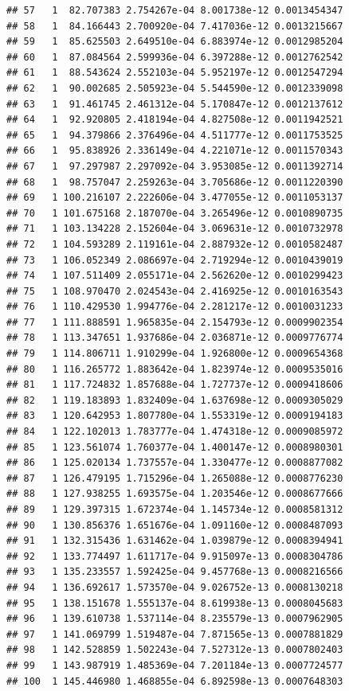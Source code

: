 \documentclass[article]{jss}\usepackage[]{graphicx}\usepackage[]{xcolor}
\makeatletter
\newenvironment{kframe}{%
 \def\at@end@of@kframe{}%
 \ifinner\ifhmode%
  \def\at@end@of@kframe{\end{minipage}}%
  \begin{minipage}{\columnwidth}%
 \fi\fi%
 \def\FrameCommand##1{\hskip\@totalleftmargin \hskip-\fboxsep
 \colorbox{shadecolor}{##1}\hskip-\fboxsep
     \hskip-\linewidth \hskip-\@totalleftmargin \hskip\columnwidth}%
 \MakeFramed {\advance\hsize-\width
   \@totalleftmargin\z@ \linewidth\hsize
   \@setminipage}}%
 {\par\unskip\endMakeFramed%
 \at@end@of@kframe}
\newenvironment{knitrout}{}{} %
\makeatother
\begin{document}
\begin{knitrout}
\begin{kframe}
\begin{verbatim}
## 57   1  82.707383 2.754267e-04 8.001738e-12 0.0013454347
## 58   1  84.166443 2.700920e-04 7.417036e-12 0.0013215667
## 59   1  85.625503 2.649510e-04 6.883974e-12 0.0012985204
## 60   1  87.084564 2.599936e-04 6.397288e-12 0.0012762542
## 61   1  88.543624 2.552103e-04 5.952197e-12 0.0012547294
## 62   1  90.002685 2.505923e-04 5.544590e-12 0.0012339098
## 63   1  91.461745 2.461312e-04 5.170847e-12 0.0012137612
## 64   1  92.920805 2.418194e-04 4.827508e-12 0.0011942521
## 65   1  94.379866 2.376496e-04 4.511777e-12 0.0011753525
## 66   1  95.838926 2.336149e-04 4.221071e-12 0.0011570343
## 67   1  97.297987 2.297092e-04 3.953085e-12 0.0011392714
## 68   1  98.757047 2.259263e-04 3.705686e-12 0.0011220390
## 69   1 100.216107 2.222606e-04 3.477055e-12 0.0011053137
## 70   1 101.675168 2.187070e-04 3.265496e-12 0.0010890735
## 71   1 103.134228 2.152604e-04 3.069631e-12 0.0010732978
## 72   1 104.593289 2.119161e-04 2.887932e-12 0.0010582487
## 73   1 106.052349 2.086697e-04 2.719294e-12 0.0010439019
## 74   1 107.511409 2.055171e-04 2.562620e-12 0.0010299423
## 75   1 108.970470 2.024543e-04 2.416925e-12 0.0010163543
## 76   1 110.429530 1.994776e-04 2.281217e-12 0.0010031233
## 77   1 111.888591 1.965835e-04 2.154793e-12 0.0009902354
## 78   1 113.347651 1.937686e-04 2.036871e-12 0.0009776774
## 79   1 114.806711 1.910299e-04 1.926800e-12 0.0009654368
## 80   1 116.265772 1.883642e-04 1.823974e-12 0.0009535016
## 81   1 117.724832 1.857688e-04 1.727737e-12 0.0009418606
## 82   1 119.183893 1.832409e-04 1.637698e-12 0.0009305029
## 83   1 120.642953 1.807780e-04 1.553319e-12 0.0009194183
## 84   1 122.102013 1.783777e-04 1.474318e-12 0.0009085972
## 85   1 123.561074 1.760377e-04 1.400147e-12 0.0008980301
## 86   1 125.020134 1.737557e-04 1.330477e-12 0.0008877082
## 87   1 126.479195 1.715296e-04 1.265088e-12 0.0008776230
## 88   1 127.938255 1.693575e-04 1.203546e-12 0.0008677666
## 89   1 129.397315 1.672374e-04 1.145734e-12 0.0008581312
## 90   1 130.856376 1.651676e-04 1.091160e-12 0.0008487093
## 91   1 132.315436 1.631462e-04 1.039879e-12 0.0008394941
## 92   1 133.774497 1.611717e-04 9.915097e-13 0.0008304786
## 93   1 135.233557 1.592425e-04 9.457768e-13 0.0008216566
## 94   1 136.692617 1.573570e-04 9.026752e-13 0.0008130218
## 95   1 138.151678 1.555137e-04 8.619938e-13 0.0008045683
## 96   1 139.610738 1.537114e-04 8.235579e-13 0.0007962905
## 97   1 141.069799 1.519487e-04 7.871565e-13 0.0007881829
## 98   1 142.528859 1.502243e-04 7.527312e-13 0.0007802403
## 99   1 143.987919 1.485369e-04 7.201184e-13 0.0007724577
## 100  1 145.446980 1.468855e-04 6.892598e-13 0.0007648303

\end{verbatim}
\end{kframe}
\end{knitrout}
\end{document}

